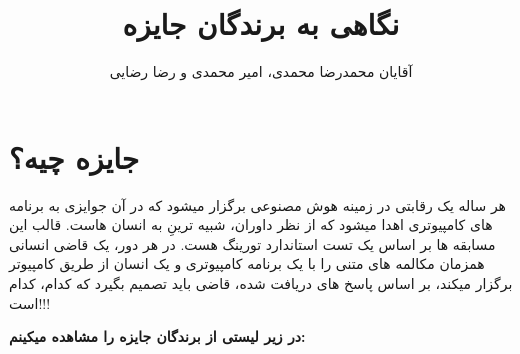 \documentclass[18pt,a4paper]{report}
\title{نگاهی به برندگان جایزه  \lr{Loebner}}
\author{ آقایان محمدرضا محمدی، امیر محمدی و رضا رضایی}
\begin{document}
	
 	\maketitle
 	\tableofcontents
 	
 	
 	\chapter{جایزه  چیه؟} 
 	هر ساله یک رقابتی در زمینه هوش مصنوعی برگزار میشود که در آن جوایزی به برنامه های کامپیوتری اهدا میشود که از نظر داوران،  شبیه ترینِ به انسان هاست. قالب این مسابقه ها بر اساس یک تست استاندارد تورینگ هست. در هر دور، یک قاضی انسانی همزمان مکالمه های متنی را با یک برنامه کامپیوتری و یک انسان از طریق کامپیوتر برگزار میکند، بر اساس پاسخ های دریافت شده، قاضی باید تصمیم بگیرد که کدام، کدام است!!!
 	
 	\large{\textbf{در زیر لیستی از برندگان جایزه   را مشاهده میکینم: }}
 	
\end{document}
